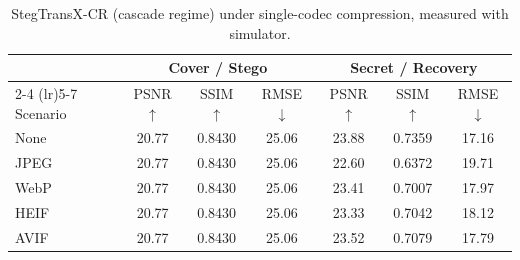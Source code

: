 \begin{table}[t]
\centering
\caption{StegTransX-CR (cascade regime) under single-codec compression, measured with simulator.}
\label{tab:cascade-single-sim}
\begin{tabular}{lcccccc}
\toprule
& \multicolumn{3}{c}{Cover / Stego} & \multicolumn{3}{c}{Secret / Recovery} \\
\cmidrule(lr){2-4} \cmidrule(lr){5-7}
Scenario & PSNR $\uparrow$ & SSIM $\uparrow$ & RMSE $\downarrow$ & PSNR $\uparrow$ & SSIM $\uparrow$ & RMSE $\downarrow$ \\
\midrule
None & 20.77 & 0.8430 & 25.06 & 23.88 & 0.7359 & 17.16 \\
JPEG & 20.77 & 0.8430 & 25.06 & 22.60 & 0.6372 & 19.71 \\
WebP & 20.77 & 0.8430 & 25.06 & 23.41 & 0.7007 & 17.97 \\
HEIF & 20.77 & 0.8430 & 25.06 & 23.33 & 0.7042 & 18.12 \\
AVIF & 20.77 & 0.8430 & 25.06 & 23.52 & 0.7079 & 17.79 \\
\bottomrule
\end{tabular}
\end{table}
